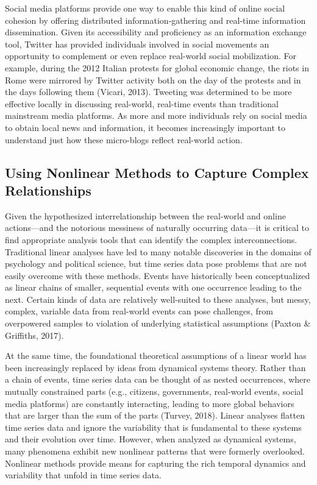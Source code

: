 \documentclass[english,man]{apa6}
\begin{document}
Social media platforms provide one way to enable this kind of online social
cohesion by offering distributed information-gathering and real-time information
dissemination. Given its accessibility and proficiency as an information
exchange tool, Twitter has provided individuals involved in social movements
an opportunity to complement or even replace real-world social mobilization.
For example, during the 2012 Italian protests for global economic change, the riots in
Rome were mirrored by Twitter activity both on the day of the protests and in the
days following them (Vicari, 2013). Tweeting was
determined to be more effective locally in discussing real-world, real-time
events than traditional mainstream media platforms. As more and more
individuals rely on social media to obtain local news and information, it
becomes increasingly important to understand just how these micro-blogs
reflect real-world action.

\hypertarget{using-nonlinear-methods-to-capture-complex-relationships}{%
\subsection{Using Nonlinear Methods to Capture Complex Relationships}\label{using-nonlinear-methods-to-capture-complex-relationships}}

Given the hypothesized interrelationship between the real-world
and online actions---and the notorious messiness of naturally occurring
data---it is critical to find appropriate analysis tools that can
identify the complex interconnections. Traditional linear analyses have led to
many notable discoveries in the domains of psychology and political science,
but time series data pose problems that are not easily overcome with these
methods. Events have historically been conceptualized as linear chains of
smaller, sequential events with one occurrence leading to the next.
Certain kinds of data are relatively well-suited to these analyses,
but messy, complex, variable data from real-world events can pose
challenges, from overpowered samples to violation of underlying
statistical assumptions (Paxton \& Griffiths, 2017).

At the same time, the foundational theoretical assumptions of a
linear world has been
increasingly replaced by ideas from dynamical systems theory. Rather than
a chain of events, time series data can be thought of as nested occurrences,
where mutually constrained parts (e.g., citizens, governments, real-world
events, social media platforms) are constantly interacting, leading to
more global behaviors that are larger than the sum of the parts
(Turvey, 2018). Linear analyses flatten time series data and ignore
the variability that is fundamental to these systems and their evolution over
time. However, when analyzed as dynamical systems, many phenomena
exhibit new nonlinear patterns that were formerly overlooked.
Nonlinear methods provide means for capturing the rich temporal
dynamics and variability that unfold in time series data.
\end{document}
